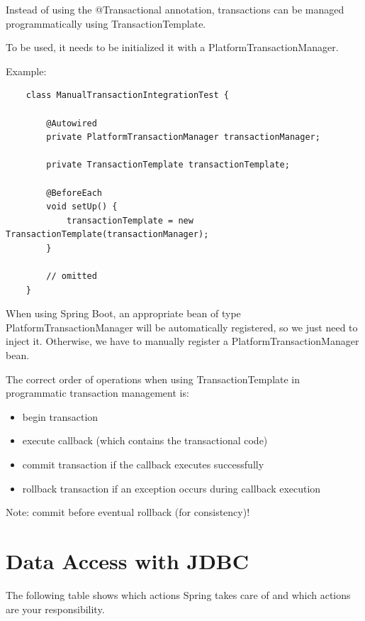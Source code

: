 \documentclass{scrartcl}
\begin{document}
Instead of using the @Transactional annotation, transactions can be managed programmatically using TransactionTemplate.

To be used, it needs to be initialized it with a PlatformTransactionManager.

Example:

\begin{lstlisting}
    class ManualTransactionIntegrationTest {

        @Autowired
        private PlatformTransactionManager transactionManager;

        private TransactionTemplate transactionTemplate;

        @BeforeEach
        void setUp() {
            transactionTemplate = new TransactionTemplate(transactionManager);
        }

        // omitted
    }
\end{lstlisting}

When using Spring Boot, an appropriate bean of type PlatformTransactionManager will be automatically registered, so we just need to inject it. Otherwise, we have to manually register a PlatformTransactionManager bean.

The correct order of operations when using TransactionTemplate in programmatic transaction management is:

\begin{itemize}
    \item begin transaction
    \item execute callback (which contains the transactional code)
    \item commit transaction if the callback executes successfully
    \item rollback transaction if an exception occurs during callback execution
\end{itemize}

Note: commit before eventual rollback (for consistency)!

\section{Data Access with JDBC}

The following table shows which actions Spring takes care of and which actions are your responsibility.
\end{document}
